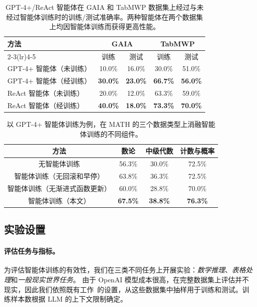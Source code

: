 \documentclass{article}
\begin{document}
\begin{table}[!t]
\centering
\setlength{\tabcolsep}{22pt}
\renewcommand{\arraystretch}{0.95}
\begin{tabular}{lcccc}
\toprule
\multirow{2}{*}{\textbf{方法}} & \multicolumn{2}{c}{GAIA} & \multicolumn{2}{c}{TabMWP} \\
\cmidrule(lr){2-3}\cmidrule(lr){4-5}
& 训练 & 测试 & 训练 & 测试 \\ \hline
GPT-4+ 智能体（未训练） & 10.0\% & 16.0\% & 30.0\% & 51.0\% \\
\rowcolor[gray]{0.9} GPT-4+ 智能体（经训练） & \textbf{30.0\%} & \textbf{23.0\%} & \textbf{66.7\%} & \textbf{56.0\%} \\
ReAct 智能体（未训练） & 20.0\% & 12.0\% & 63.3\% & 59.0\% \\
\rowcolor[gray]{0.9} ReAct 智能体（经训练） & \textbf{40.0\%} & \textbf{18.0\%} & \textbf{73.3\%} & \textbf{70.0\%} \\
\bottomrule
\end{tabular}
\caption{GPT-4+/ReAct 智能体在 GAIA 和 TabMWP 数据集上经过与未经过智能体训练时的训练/测试准确率。两种智能体在两个数据集上均因智能体训练而获得更高性能。}
\label{tab:gaiatab_main}
\end{table}

\begin{table}[!t]
\centering
\setlength{\tabcolsep}{7pt}
\renewcommand{\arraystretch}{0.95}
\begin{tabular}{cccc}
\toprule[1.5pt]
\textbf{方法} & 数论 & 中级代数 & 计数与概率 \\ \hline
无智能体训练 & 56.3\% & 30.0\% & 72.5\% \\
智能体训练（无回滚和早停） & 63.8\% & 36.3\% & 72.5\% \\
智能体训练（无渐进式函数更新） & 60.0\% & 28.8\% & 70.0\% \\
\rowcolor[gray]{0.9} 智能体训练（本文） & \textbf{67.5\%} & \textbf{38.8\%} & \textbf{76.3\%} \\
\bottomrule[1.5pt]
\end{tabular}
\caption{以 GPT-4+ 智能体训练为例，在 MATH 的三个数据类型上消融智能体训练的不同组件。}
\label{tab:abla}
\end{table}

\subsection{实验设置}
\label{sec_expsetup}

\paragraph{评估任务与指标。}
为评估智能体训练的有效性，我们在三类不同任务上开展实验：\emph{数学推理}、\emph{表格处理}和\emph{一般现实世界任务}。
由于 OpenAI 模型成本很高，在完整数据集上评估并不现实，因此我们依照既有工作~\cite{yuan2023craft,wu2023empirical}的设置，从这些数据集中抽样用于训练和测试。训练样本数根据 LLM 的上下文限制确定。
\end{document}
